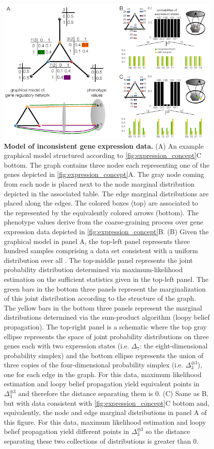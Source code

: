 \begin{figure}[!ht]
\centering
\noindent\includegraphics[width=0.9\columnwidth]{fig/inconsistentthreecycle.pdf}
\caption{{\bf Model of inconsistent gene expression data.} (A) An example graphical model structured according to \ref{fig:expression_concept}C bottom. The graph contains three nodes each representing one of the genes depicted in \ref{fig:expression_concept}A. The gray node coming from each node is placed next to the node marginal distribution depicted in the associated table. The edge marginal distributions are placed along the edges. The colored boxes (top) are associated to the \gnpm{} represented by the equivalently colored arrows (bottom). The phenotype values derive from the coarse-graining process over gene expression data depicted in \ref{fig:expression_concept}B. (B) Given the graphical model in panel A, the top-left panel represents three hundred samples comprising a data set consistent with a uniform distribution over all \gnpm{}. The top-middle panel represents the joint probability distribution determined via maximum-likelihood estimation on the sufficient statistics given in the top-left panel. The green bars in the bottom three panels represent the marginalization of this joint distribution according to the structure of the graph. The yellow bars in the bottom three panels represent the marginal distributions determined via the sum-product algorithm (loopy belief propagation). The top-right panel is a schematic where the top gray ellipse represents the space of joint probability distributions on three genes each with two expression states (i.e. $\Delta_7$: the eight-dimensional probability simplex) and the bottom ellipse represents the union of three copies of the four-dimensional probability simplex (i.e. $\Delta_3^{\oplus 3}$), one for each edge in the graph.  For this data, maximum likelihood estimation and loopy belief propagation yield equivalent points in $\Delta_3^{\oplus 3}$ and therefore the distance separating them is $0$. (C) Same as B, but with data consistent with \ref{fig:expression_concept}C bottom and, equivalently, the node and edge marginal distributions in panel A of this figure. For this data, maximum likelihood estimation and loopy belief propagation yield different points in $\Delta_3^{\oplus 3}$ so the distance separating these two collections of distributions is greater than $0$.}
\label{fig:inconsistentthreecycle}
\end{figure}

